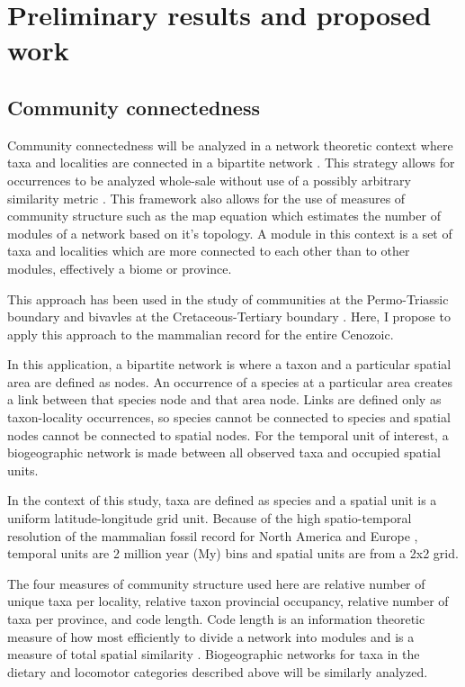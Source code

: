 \documentclass[11pt,letterpaper]{article}
\begin{document}
\section{Preliminary results and proposed work}
\subsection{Community connectedness}
Community connectedness will be analyzed in a network theoretic context where taxa and localities are connected in a bipartite network \citep{Sidor2013,Vilhena2013,Vilhena2013b}. This strategy allows for occurrences to be analyzed whole-sale without use of a possibly arbitrary similarity metric \citep{Sidor2013}. This framework also allows for the use of measures of community structure such as the map equation \citep{Rosvall2008,Rosvall2009a} which estimates the number of modules of a network based on it's topology. A module in this context is a set of taxa and localities which are more connected to each other than to other modules, effectively a biome or province. 

This approach has been used in the study of communities at the Permo-Triassic boundary \citep{Sidor2013} and bivavles at the Cretaceous-Tertiary boundary \citep{Vilhena2013}. Here, I propose to apply this approach to the mammalian record for the entire Cenozoic.

In this application, a bipartite network is where a taxon and a particular spatial area are defined as nodes. An occurrence of a species at a particular area creates a link between that species node and that area node. Links are defined only as taxon-locality occurrences, so species cannot be connected to species and spatial nodes cannot be connected to spatial nodes. For the temporal unit of interest, a biogeographic network is made between all observed taxa and occupied spatial units. 

In the context of this study, taxa are defined as species and a spatial unit is a uniform latitude-longitude grid unit. Because of the high spatio-temporal resolution of the mammalian fossil record for North America and Europe \citep{Alroy2009,Marcot2014,Fortelius2002,Jernvall2004}, temporal units are 2 million year (My) bins and spatial units are from a 2x2 grid. 

The four measures of community structure used here are relative number of unique taxa per locality, relative taxon provincial occupancy, relative number of taxa per province, and code length. Code length is an information theoretic measure of how most efficiently to divide a network into modules and is a measure of total spatial similarity \citep{Rosvall2008,Rosvall2009a}. Biogeographic networks for taxa in the dietary and locomotor categories described above will be similarly analyzed.
\end{document}

